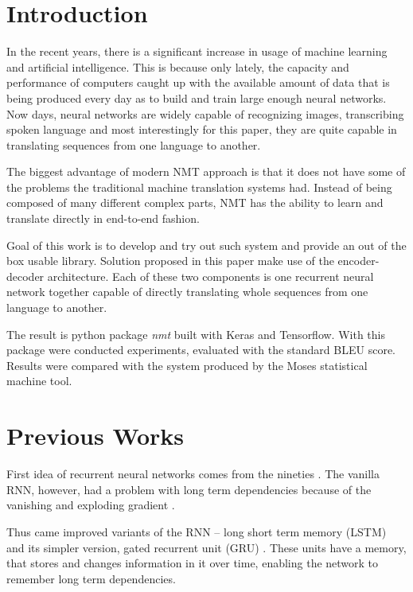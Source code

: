 \documentclass{ExcelAtFIT}
\affiliation{*%
  \href{mailto:xholcn01@stud.fit.vutbr.cz}{xholcn01@stud.fit.vutbr.cz},
  \textit{Faculty of Information Technology, Brno University of Technology}}
\begin{document}
\startdocument


\section{Introduction}
In the recent years, there is a significant increase in usage of machine learning and artificial intelligence. This is because only lately, the capacity and performance of computers caught up with the available amount of data that is being produced every day as to build and train large enough neural networks. Now days, neural networks are widely capable of recognizing images, transcribing spoken language and most interestingly for this paper, they are quite capable in translating sequences from one language to another.

The biggest advantage of modern NMT approach is that it does not have some of the problems the traditional machine translation systems had. Instead of being composed of many different complex parts, NMT has the ability to learn and translate directly in end-to-end fashion.

Goal of this work is to develop and try out such system and provide an out of the box usable library. Solution proposed in this paper make use of the encoder-decoder architecture. Each of these two components is one recurrent neural network together capable of directly translating whole sequences from one language to another.

The result is python package \emph{nmt} built with Keras and Tensorflow. With this package were conducted experiments, evaluated with the standard BLEU score. Results were compared with the system produced by the Moses \cite{Moses} statistical machine tool.


\section{Previous Works}
First idea of recurrent neural networks comes from the nineties \cite{rnn}. The vanilla RNN, however, had a problem with long term dependencies because of the vanishing and exploding gradient \cite{gradientProblems}.

Thus came improved variants of the RNN -- long short term memory (LSTM) \cite{LSTM, forgetLSTM} and its simpler version, gated recurrent unit (GRU) \cite{GRU}. These units have a memory, that stores and changes information in it over time, enabling the network to remember long term dependencies.
\end{document}
